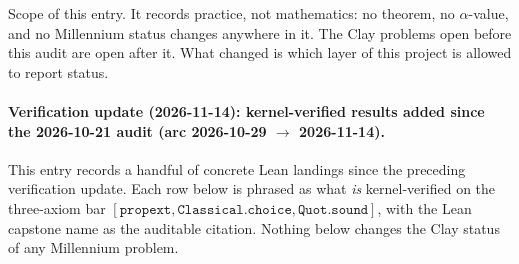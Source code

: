 \noindent Scope of this entry. It records practice, not mathematics: no
theorem, no $\alpha$-value, and no Millennium status changes anywhere in it. The
Clay problems open before this audit are open after it. What changed is which
layer of this project is allowed to report status.

\paragraph{Verification update (2026-11-14): kernel-verified results added
since the 2026-10-21 audit (arc 2026-10-29 $\to$ 2026-11-14).}

This entry records a handful of concrete Lean landings since the
preceding verification update.  Each row below is phrased as what
\emph{is} kernel-verified on the three-axiom bar
$[\mathtt{propext}, \mathtt{Classical.choice}, \mathtt{Quot.sound}]$,
with the Lean capstone name as the auditable citation.  Nothing below
changes the Clay status of any Millennium problem.

